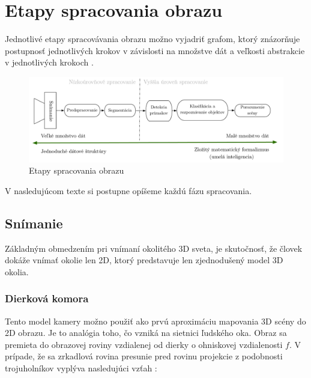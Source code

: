 \section{Etapy spracovania obrazu}

Jednotlivé etapy spracovávania obrazu možno vyjadriť grafom, ktorý znázorňuje postupnosť jednotlivých krokov v závislosti na množstve dát a veľkosti abstrakcie v jednotlivých krokoch \cite{Analysis_and_Machine_Vision}. 

\begin{figure}[H]
\begin{center}
	\includegraphics[scale=0.45]{images/phaseCV}
	\caption{Etapy spracovania obrazu}
	\end{center}
\end{figure}

V nasledujúcom texte si postupne opíšeme každú fázu spracovania. 


\subsection{Snímanie}
Základným obmedzením pri vnímaní okolitého 3D sveta, je skutočnosť, že človek dokáže vnímať okolie len 2D, ktorý predstavuje len zjednodušený model 3D okolia.


\subsubsection{Dierková komora}Tento model kamery možno použiť ako prvú aproximáciu mapovania 3D scény do 2D obrazu. Je to analógia toho, čo vzniká na sietnici ľudského oka.  Obraz sa premieta do obrazovej roviny vzdialenej od dierky o ohniskovej vzdialenosti $f$. V prípade, že sa zrkadlová rovina presunie pred rovinu projekcie z podobnosti trojuholníkov vyplýva nasledujúci vzťah \cite{Pin_hole_camera}:



